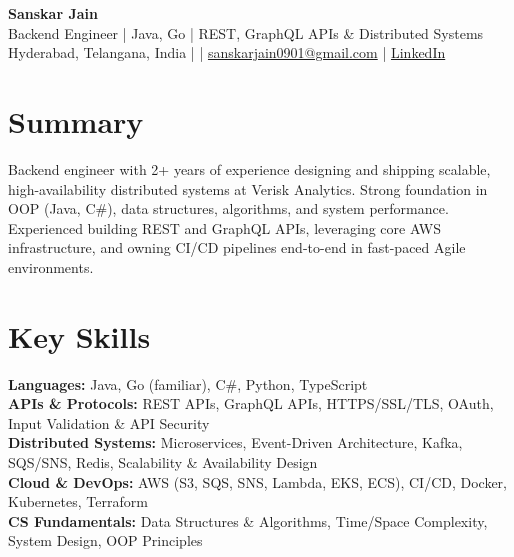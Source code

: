 \documentclass[10pt,letterpaper]{article}
\begin{document}
\begin{center}
    {\Large \textbf{Sanskar Jain}} \\
    Backend Engineer | Java, Go | REST, GraphQL APIs \& Distributed Systems \\
    Hyderabad, Telangana, India \enspace |  \enspace | \enspace
    \href{mailto:sanskarjain0901@gmail.com}{sanskarjain0901@gmail.com} \enspace | \enspace
    \href{https://www.linkedin.com/in/sanskar-jain0901/}{LinkedIn}
\end{center}

\section*{Summary}
Backend engineer with 2+ years of experience designing and shipping scalable, high-availability distributed systems at Verisk Analytics. Strong foundation in OOP (Java, C\#), data structures, algorithms, and system performance. Experienced building REST and GraphQL APIs, leveraging core AWS infrastructure, and owning CI/CD pipelines end-to-end in fast-paced Agile environments.

\section*{Key Skills}
\textbf{Languages:} Java, Go (familiar), C\#, Python, TypeScript \\
\textbf{APIs \& Protocols:} REST APIs, GraphQL APIs, HTTPS/SSL/TLS, OAuth, Input Validation \& API Security \\
\textbf{Distributed Systems:} Microservices, Event-Driven Architecture, Kafka, SQS/SNS, Redis, Scalability \& Availability Design \\
\textbf{Cloud \& DevOps:} AWS (S3, SQS, SNS, Lambda, EKS, ECS), CI/CD, Docker, Kubernetes, Terraform \\
\textbf{CS Fundamentals:} Data Structures \& Algorithms, Time/Space Complexity, System Design, OOP Principles
\end{document}
